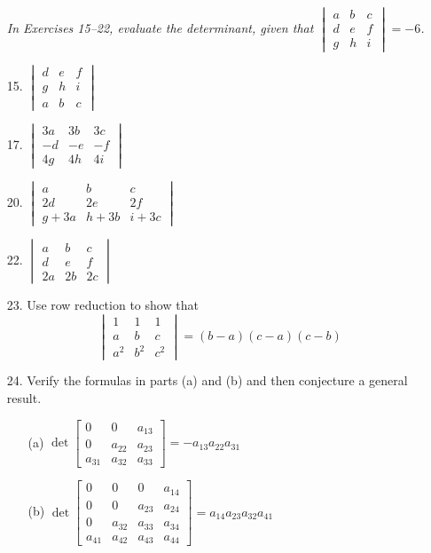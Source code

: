 \documentclass{article}
\theoremstyle{mystyle}
\begin{document}
\begin{enumerate}
\noindent\textit{In Exercises 15--22, evaluate the determinant, given that $\begin{vmatrix}a&b&c\\d&e&f\\g&h&i\end{vmatrix}=-6$.}

\item[15.] $\begin{vmatrix}d&e&f\\g&h&i\\a&b&c\end{vmatrix}$

\item[17.] $\begin{vmatrix}3a&3b&3c\\-d&-e&-f\\4g&4h&4i\end{vmatrix}$

\item[20.] $\begin{vmatrix}a&b&c\\2d&2e&2f\\g+3a&h+3b&i+3c\end{vmatrix}$

\item[22.] $\begin{vmatrix}a&b&c\\d&e&f\\2a&2b&2c\end{vmatrix}$

\item[23.] Use row reduction to show that
\[
\begin{vmatrix}1&1&1\\a&b&c\\a^2&b^2&c^2\end{vmatrix}=(b-a)(c-a)(c-b)
\]

\item[24.] Verify the formulas in parts (a) and (b) and then conjecture a general result.
\begin{enumerate}
\item[(a)] $\det\begin{bmatrix}0&0&a_{13}\\0&a_{22}&a_{23}\\a_{31}&a_{32}&a_{33}\end{bmatrix}=-a_{13}a_{22}a_{31}$
\item[(b)] $\det\begin{bmatrix}0&0&0&a_{14}\\0&0&a_{23}&a_{24}\\0&a_{32}&a_{33}&a_{34}\\a_{41}&a_{42}&a_{43}&a_{44}\end{bmatrix}=a_{14}a_{23}a_{32}a_{41}$
\end{enumerate}


\end{enumerate}
\end{document}
